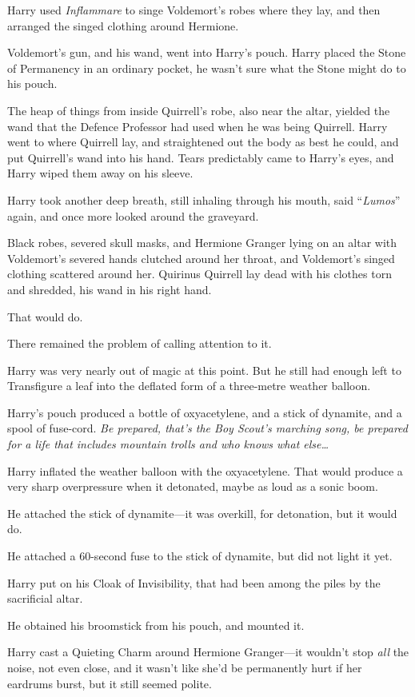 Harry used \emph{Inflammare} to singe Voldemort’s robes where they lay, and then arranged the singed clothing around Hermione.

Voldemort’s gun, and his wand, went into Harry’s pouch. Harry placed the Stone of Permanency in an ordinary pocket, he wasn’t sure what the Stone might do to his pouch.

The heap of things from inside Quirrell’s robe, also near the altar, yielded the wand that the Defence Professor had used when he was being Quirrell. Harry went to where Quirrell lay, and straightened out the body as best he could, and put Quirrell’s wand into his hand. Tears predictably came to Harry’s eyes, and Harry wiped them away on his sleeve.

Harry took another deep breath, still inhaling through his mouth, said “\emph{Lumos}” again, and once more looked around the graveyard.

Black robes, severed skull masks, and Hermione Granger lying on an altar with Voldemort’s severed hands clutched around her throat, and Voldemort’s singed clothing scattered around her. Quirinus Quirrell lay dead with his clothes torn and shredded, his wand in his right hand.

That would do.

There remained the problem of calling attention to it.

Harry was very nearly out of magic at this point. But he still had enough left to Transfigure a leaf into the deflated form of a three-metre weather balloon.

Harry’s pouch produced a bottle of oxyacetylene, and a stick of dynamite, and a spool of fuse-cord. \emph{Be prepared, that’s the Boy Scout’s marching song, be prepared for a life that includes mountain trolls and who knows what else…}

Harry inflated the weather balloon with the oxyacetylene. That would produce a very sharp overpressure when it detonated, maybe as loud as a sonic boom.

He attached the stick of dynamite—it was overkill, for detonation, but it would do.

He attached a 60-second fuse to the stick of dynamite, but did not light it yet.

Harry put on his Cloak of Invisibility, that had been among the piles by the sacrificial altar.

He obtained his broomstick from his pouch, and mounted it.

Harry cast a Quieting Charm around Hermione Granger—it wouldn’t stop \emph{all} the noise, not even close, and it wasn’t like she’d be permanently hurt if her eardrums burst, but it still seemed polite.

